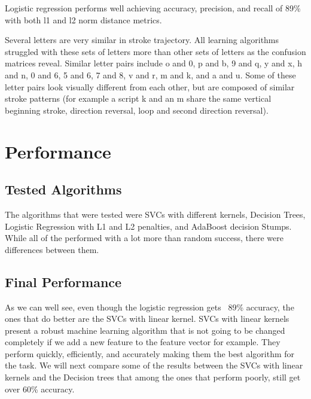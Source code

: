 \documentclass{article}
\begin{document}
Logistic regression performs well achieving accuracy, precision, and recall of 89\% with both l1 and l2 norm distance metrics.  
 
Several letters are very similar in stroke trajectory.  All learning algorithms struggled with these sets of letters more than other sets of letters as the confusion matrices reveal.  Similar letter pairs include o and 0, p and b, 9 and q, y and x, h and n, 0 and 6, 5 and 6, 7 and 8, v and r, m and k, and a and u.  Some of these letter pairs look visually different from each other, but are composed of similar stroke patterns (for example a script k and an m share the same vertical beginning stroke, direction reversal, loop and second direction reversal).


\section{Performance}
\subsection{Tested Algorithms}
The algorithms that were tested were SVCs with different kernels, Decision Trees, Logistic Regression with L1 and L2 penalties, and AdaBoost decision Stumps. While all of the performed with a lot more than random success, there were differences between them.

\subsection{Final Performance}

 As we can well see, even though the logistic regression gets ~89\% accuracy, the ones that do better are the SVCs with linear kernel. SVCs with linear kernels present a robust machine learning algorithm that is not going to be changed completely if we add a new feature to the feature vector for example. They perform quickly, efficiently, and accurately making them the best algorithm for the task. We will next compare some of the results between the SVCs with linear kernels and the Decision trees that among the ones that perform poorly, still get over 60\% accuracy.
\end{document}
